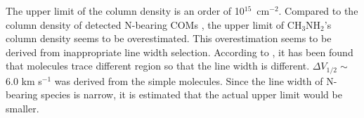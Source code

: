 The upper limit of the column density is an order of 10$^{15}$~cm$^{-2}$.
Compared to the column density of detected N-bearing COMs 
\citep[e.g., 1.2$\sim$1.9 $\times$ 10$^{14}$ cm$^{-2}$ for NH$_2$CHO,][]{Oya+2017}, 
the upper limit of CH$_{3}$NH$_{2}$'s column density seems to be overestimated.
This overestimation seems to be derived from inappropriate line width selection.
According to \citet{Oya+2017}, it has been found that molecules trace different region so that the line width is different. 
$\Delta V_{1/2} \sim$ 6.0 km s$^{-1}$ was derived from the simple molecules.
Since the line width of N-bearing species is narrow, it is estimated that the actual upper limit would be smaller.